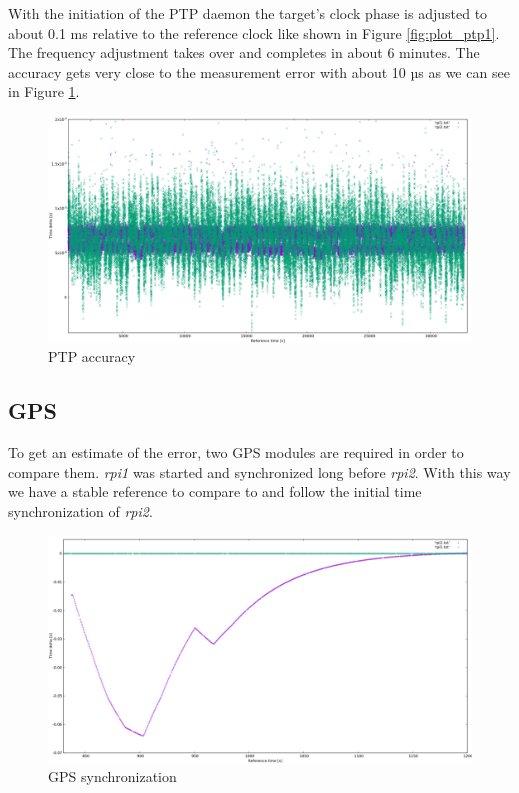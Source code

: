 With the initiation of the PTP daemon the target’s clock phase is adjusted to about 0.1 ms relative to the reference clock like shown in Figure \ref{fig:plot_ptp1}. The frequency adjustment takes over and completes in about 6 minutes. The accuracy gets very close to the measurement error with about 10 µs as we can see in Figure \ref{fig:plot_ptp2}.

\begin{figure}[tb]
	\centering
	\includegraphics[width=1.0\textwidth]{figures/plot_ptp2.png}
	\caption{PTP accuracy}
	\label{fig:plot_ptp2}
\end{figure}

\subsection{GPS}

To get an estimate of the error, two GPS modules are required in order to compare them. \textit{rpi1} was started and synchronized long before \textit{rpi2}. With this way we have a stable reference to compare to and follow the initial time synchronization of \textit{rpi2}.

\begin{figure}[tb]
	\centering
	\includegraphics[width=1.0\textwidth]{figures/plot_gps1.png}
	\caption{GPS synchronization}
	\label{fig:plot_gps1}
\end{figure}

